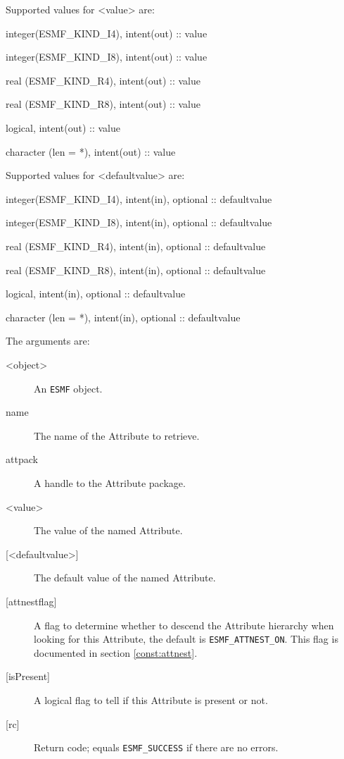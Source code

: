    Supported values for <value> are:
   \begin{description}
   \item integer(ESMF\_KIND\_I4), intent(out) :: value
   \item integer(ESMF\_KIND\_I8), intent(out) :: value
   \item real (ESMF\_KIND\_R4), intent(out) :: value
   \item real (ESMF\_KIND\_R8), intent(out) :: value
   \item logical, intent(out) :: value
   \item character (len = *), intent(out) :: value
   \end{description}
  
   Supported values for <defaultvalue> are:
   \begin{description}
   \item integer(ESMF\_KIND\_I4), intent(in), optional :: defaultvalue
   \item integer(ESMF\_KIND\_I8), intent(in), optional :: defaultvalue
   \item real (ESMF\_KIND\_R4), intent(in), optional :: defaultvalue
   \item real (ESMF\_KIND\_R8), intent(in), optional :: defaultvalue
   \item logical, intent(in), optional :: defaultvalue
   \item character (len = *), intent(in), optional :: defaultvalue
   \end{description}
  
   The arguments are:
   \begin{description}
   \item [<object>]
   An {\tt ESMF} object.
   \item [name]
   The name of the Attribute to retrieve.
   \item [attpack]
   A handle to the Attribute package.
   \item [<value>]
   The value of the named Attribute.
   \item [{[<defaultvalue>]}]
   The default value of the named Attribute.
   \item [{[attnestflag]}]
   A flag to determine whether to descend the
   Attribute hierarchy when looking for this Attribute, the default
   is {\tt ESMF\_ATTNEST\_ON}. This flag is documented in section
   \ref{const:attnest}.
   \item [{[isPresent]}]
   A logical flag to tell if this Attribute is present or not.
   \item [{[rc]}]
   Return code; equals {\tt ESMF\_SUCCESS} if there are no errors.
   \end{description}
  
